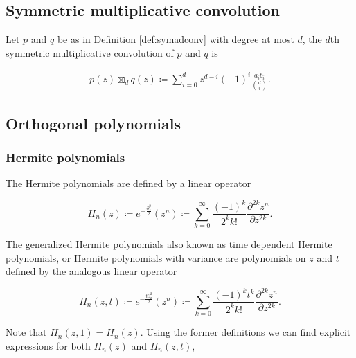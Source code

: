 \subsection{Symmetric multiplicative convolution}

\begin{definition}
    Let $p$ and $q$ be as in Definition \ref{def:symadconv} with degree at most $d$, the $d$th symmetric multiplicative convolution of $p$ and $q$ is 

    \begin{align*}
        p(z) \boxtimes_d q(z) \coloneqq \sum_{i=0}^d z^{d-i}(-1)^i\frac{a_ib_i}{\binom di}.
    \end{align*}
\end{definition}


\subsection{Orthogonal polynomials}

\subsubsection{Hermite polynomials}

The Hermite polynomials are defined by a linear operator

\begin{equation}
    H_n(z) \coloneqq e^{-\frac{\partial_z^2}{2}}(z^n) \coloneqq \sum_{k=0}^\infty \frac{(-1)^k}{2^k k!} \frac{\partial^{2k} z^n}{\partial z^{2k}}.
\end{equation}

The generalized Hermite polynomials also known as time dependent Hermite polynomials, or Hermite polynomials with variance are polynomials on $z$ and $t$ defined by the analogous linear operator

\begin{equation}
    H_n(z,t) \coloneqq e^{-\frac{t\partial_z^2}{2}}(z^n) \coloneqq \sum_{k=0}^\infty \frac{(-1)^kt^k}{2^k k!} \frac{\partial^{2k} z^n}{\partial z^{2k}}.
\end{equation}

Note that $H_n(z,1)=H_n(z)$. Using the former definitions we can find explicit expressions for both $H_n(z)$ and $H_n(z,t)$,

